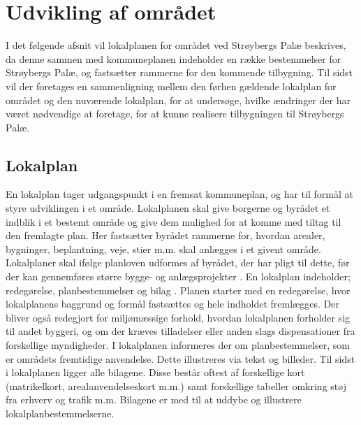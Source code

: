 \chapter{Udvikling af området}
I det følgende afsnit vil lokalplanen for området ved Strøybergs Palæ beskrives, da denne sammen med kommuneplanen indeholder en række bestemmelser for Strøybergs Palæ, og fastsætter rammerne for den kommende tilbygning. 
\newline \indent{     }   Til sidst vil der foretages en sammenligning mellem den førhen gældende lokalplan for området og den nuværende lokalplan, for at undersøge, hvilke ændringer der har været nødvendige at foretage, for at kunne realisere tilbygningen til Strøybergs Palæ.

\section{Lokalplan}
En lokalplan tager udgangspunkt i en fremsat kommuneplan, og har til formål at styre udviklingen i et område. Lokalplanen skal give borgerne og byrådet et indblik i et bestemt område og give dem mulighed for at komme med tiltag til den fremlagte plan. Her fastsætter byrådet rammerne for, hvordan arealer, bygninger, beplantning, veje, stier m.m. skal anlægges i et givent område. Lokalplaner skal ifølge planloven udformes af byrådet, der har pligt til dette, før der kan gennemføres større bygge- og anlægsprojekter \citep[ s. 4]{lokalplan}.
\newline
\newline
En lokalplan indeholder; redegørelse, planbestemmelser og bilag \citep[ s. 4]{lokalplan}.
\newline \indent{     }  Planen starter med en redegørelse, hvor lokalplanens baggrund og formål fastsættes og hele indholdet fremlægges. Der bliver også redegjort for miljømæssige forhold, hvordan lokalplanen forholder sig til andet byggeri, og om der kræves tilladelser eller anden slags dispensationer fra forskellige myndigheder.  
\newline \indent{     }   I lokalplanen informeres der om planbestemmelser, som er områdets fremtidige anvendelse. Dette illustreres via tekst og billeder.
\newline \indent{     }  Til sidst i lokalplanen ligger alle bilagene. Disse består oftest af forskellige kort (matrikelkort, arealanvendelseskort m.m.) samt forskellige tabeller omkring støj fra erhverv og trafik m.m. Bilagene er med til at uddybe og illustrere lokalplanbestemmelserne.
\newline
